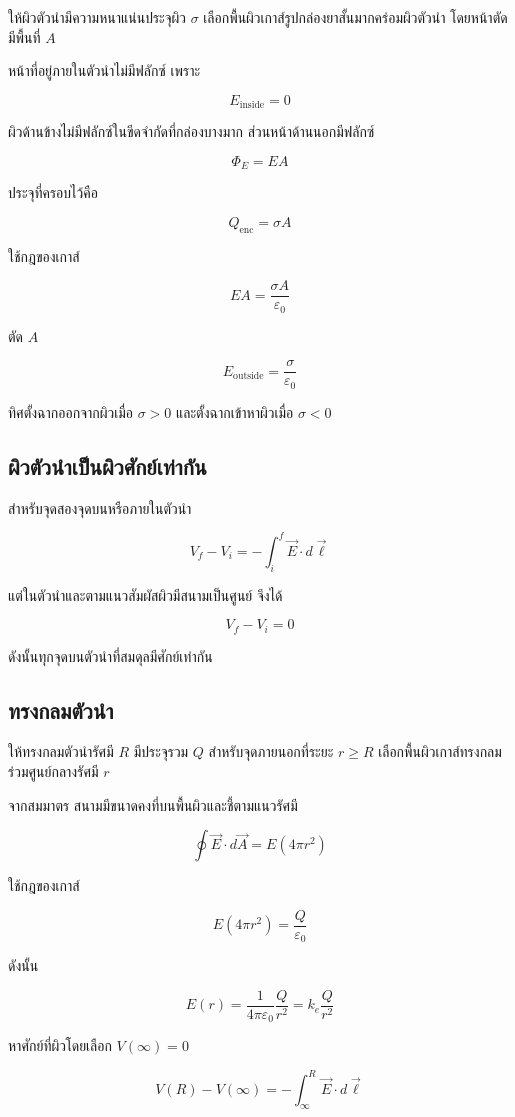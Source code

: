 ให้ผิวตัวนำมีความหนาแน่นประจุผิว $\sigma$ เลือกพื้นผิวเกาส์รูปกล่องยาสั้นมากคร่อมผิวตัวนำ โดยหน้าตัดมีพื้นที่ $A$

หน้าที่อยู่ภายในตัวนำไม่มีฟลักซ์ เพราะ

\[
E_{\text{inside}}=0
\]

ผิวด้านข้างไม่มีฟลักซ์ในขีดจำกัดที่กล่องบางมาก ส่วนหน้าด้านนอกมีฟลักซ์

\[
\Phi_E=EA
\]

ประจุที่ครอบไว้คือ

\[
Q_{\text{enc}}=\sigma A
\]

ใช้กฎของเกาส์

\[
EA=\frac{\sigma A}{\varepsilon_0}
\]

ตัด $A$

\[
\boxed{E_{\text{outside}}=\frac{\sigma}{\varepsilon_0}}
\]

ทิศตั้งฉากออกจากผิวเมื่อ $\sigma>0$ และตั้งฉากเข้าหาผิวเมื่อ $\sigma<0$

\subsection{ผิวตัวนำเป็นผิวศักย์เท่ากัน}

สำหรับจุดสองจุดบนหรือภายในตัวนำ

\[
V_f-V_i=-\int_i^f \vec{E}\cdot d\vec{\ell}
\]

แต่ในตัวนำและตามแนวสัมผัสผิวมีสนามเป็นศูนย์ จึงได้

\[
V_f-V_i=0
\]

ดังนั้นทุกจุดบนตัวนำที่สมดุลมีศักย์เท่ากัน

\subsection{ทรงกลมตัวนำ}

ให้ทรงกลมตัวนำรัศมี $R$ มีประจุรวม $Q$ สำหรับจุดภายนอกที่ระยะ $r\ge R$ เลือกพื้นผิวเกาส์ทรงกลมร่วมศูนย์กลางรัศมี $r$

จากสมมาตร สนามมีขนาดคงที่บนพื้นผิวและชี้ตามแนวรัศมี

\[
\oint \vec{E}\cdot d\vec{A}=E(4\pi r^2)
\]

ใช้กฎของเกาส์

\[
E(4\pi r^2)=\frac{Q}{\varepsilon_0}
\]

ดังนั้น

\[
E(r)=\frac{1}{4\pi\varepsilon_0}\frac{Q}{r^2}
=k_e\frac{Q}{r^2}
\]

หาศักย์ที่ผิวโดยเลือก $V(\infty)=0$

\[
V(R)-V(\infty)
=
-\int_{\infty}^{R}\vec{E}\cdot d\vec{\ell}
\]

